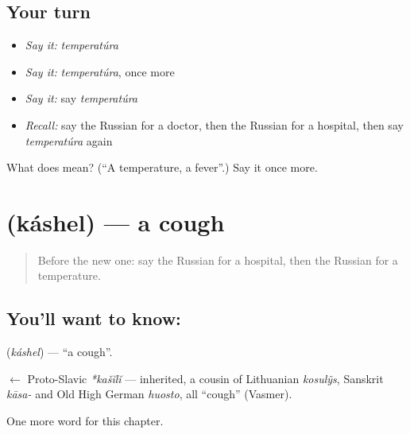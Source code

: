 \subsection*{Your turn}
\begin{itemize}
\raggedright
  \item \emph{Say it:} \emph{temperatúra}
  \item \emph{Say it:} \emph{temperatúra}, once more
  \item \emph{Say it:} say \emph{temperatúra}
  \item \emph{Recall:} say the Russian for a doctor, then the Russian for a hospital, then say \emph{temperatúra} again
\end{itemize}

\begin{tcolorbox}[breakable,colback=teal!4,colframe=teal!35!black,title={Before you move on}]
What does  mean? (\textquotedblleft{}A temperature, a fever\textquotedblright{}.) Say it once more.
\end{tcolorbox}
\section[\texorpdfstring{\ru{кашель} (káshel)}{кашель (káshel)}]{ (káshel) — a cough}

\label{lesson:RU-C33-cough}



\begin{quote}
Before the new one: say the Russian for a hospital, then the Russian for a temperature.
\end{quote}

\subsection*{You'll want to know: }
\textbf{} (\emph{káshel}) — \textquotedblleft{}a cough\textquotedblright{}.

\begin{cousinweb}
\textbf{} $\leftarrow$ Proto-Slavic \emph{*kašĭlĭ} — inherited, a cousin of Lithuanian \emph{kosulỹs}, Sanskrit \emph{kāsa-} and Old High German \emph{huosto}, all \textquotedblleft{}cough\textquotedblright{} (Vasmer).
\end{cousinweb}

\begin{grammarlens}[title={What you've built}]
One more word for this chapter.
\end{grammarlens}

